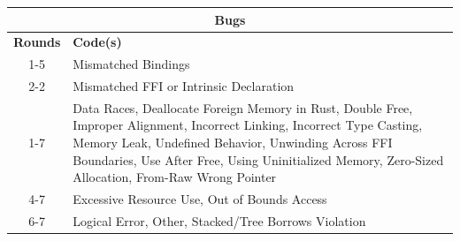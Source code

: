 \centering
\small
\begin{tabular}{|c|p{10cm}|}
\hline
\multicolumn{2}{|c|}{\textbf{Bugs}}                                                                                                                                                                                                                                                                                             \\ \hline
\multicolumn{1}{|c|}{\textbf{Rounds}} & \textbf{Code(s)}                                                                                                                                                                                                                                                                        \\ \hline
\multicolumn{1}{|c|}{1-5}             & Mismatched Bindings                                                                                                                                                                                                                                                                     \\ \cline{2-2} 
\multicolumn{1}{|c|}{6-7}             & Mismatched FFI or Intrinsic Declaration                                                                                                                                                                                                                                                 \\ \hline
\multicolumn{1}{|c|}{1-7}             & Data Races, Deallocate Foreign Memory in Rust, Double Free, Improper Alignment, Incorrect Linking, Incorrect Type Casting, Memory Leak, Undefined Behavior, Unwinding Across FFI Boundaries, Use After Free, Using Uninitialized Memory, Zero-Sized Allocation, From-Raw Wrong Pointer \\ \hline
\multicolumn{1}{|c|}{4-7}             & Excessive Resource Use, Out of Bounds Access                                                                                                                                                                                                                                            \\ \hline
\multicolumn{1}{|c|}{6-7}            & Logical Error, Other, Stacked/Tree Borrows Violation                                                                                                                                                                                                                                    \\ \hline
\end{tabular}
